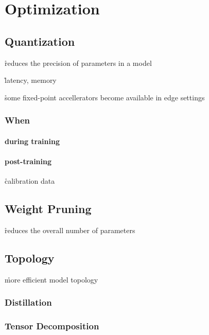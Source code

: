\chapter{Optimization}


\section{Quantization}


\r{reduces the precision of parameters in a model}

\r{latency, memory}

\r{some fixed-point accellerators become available in edge settings}

\subsection{When}

\subsubsection{during training}

\subsubsection{post-training}

\r{calibration data}

\section{Weight Pruning}

\r{reduces the overall number of parameters}

\section{Topology}

\r{more efficient model topology}

\subsection{Distillation}

\subsection{Tensor Decomposition}

